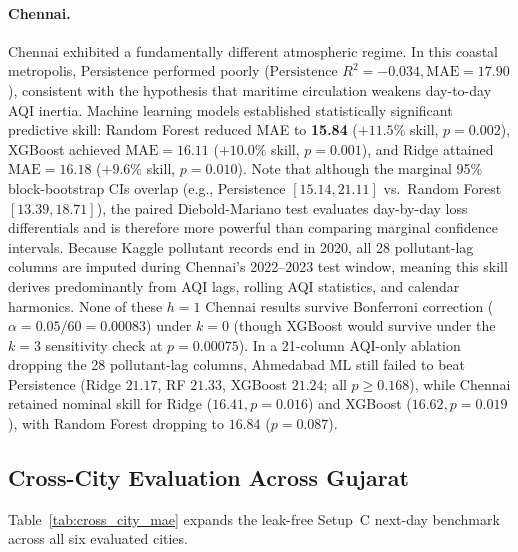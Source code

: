 \paragraph{Chennai.}
Chennai exhibited a fundamentally different atmospheric regime. In this coastal metropolis, Persistence performed poorly ($\text{Persistence } R^2 = -0.034, \text{MAE} = 17.90$), consistent with the hypothesis that maritime circulation weakens day-to-day AQI inertia. Machine learning models established statistically significant predictive skill: Random Forest reduced MAE to \textbf{15.84} ($+11.5\%$ skill, $p = 0.002$), XGBoost achieved $\text{MAE} = 16.11$ ($+10.0\%$ skill, $p = 0.001$), and Ridge attained $\text{MAE} = 16.18$ ($+9.6\%$ skill, $p = 0.010$). Note that although the marginal 95\% block-bootstrap CIs overlap (e.g., Persistence $[15.14, 21.11]$ vs.\ Random Forest $[13.39, 18.71]$), the paired Diebold-Mariano test evaluates day-by-day loss differentials and is therefore more powerful than comparing marginal confidence intervals. Because Kaggle pollutant records end in 2020, all 28 pollutant-lag columns are imputed during Chennai's 2022--2023 test window, meaning this skill derives predominantly from AQI lags, rolling AQI statistics, and calendar harmonics. None of these $h=1$ Chennai results survive Bonferroni correction ($\alpha = 0.05/60 = 0.00083$) under $k=0$ (though XGBoost would survive under the $k=3$ sensitivity check at $p = 0.00075$). In a 21-column AQI-only ablation dropping the 28 pollutant-lag columns, Ahmedabad ML still failed to beat Persistence (Ridge $21.17$, RF $21.33$, XGBoost $21.24$; all $p \ge 0.168$), while Chennai retained nominal skill for Ridge ($16.41, p = 0.016$) and XGBoost ($16.62, p = 0.019$), with Random Forest dropping to $16.84$ ($p = 0.087$).

\subsection{Cross-City Evaluation Across Gujarat}
\label{sec:multicity_results}
Table~\ref{tab:cross_city_mae} expands the leak-free Setup~C next-day benchmark across all six evaluated cities.



